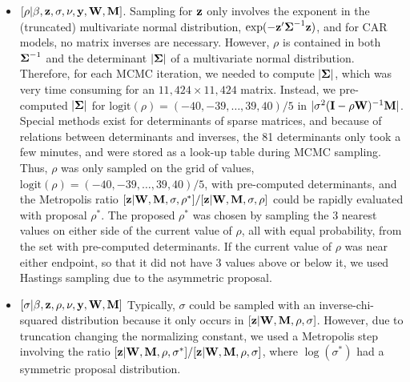\documentclass[11pt, titlepage]{article}
\begin{document}
\begin{spacing}{1.9}
\begin{flushleft}
\begin{itemize}
  \item $[\rho|\beta,\mathbf{z},\sigma,\nu,\mathbf{y},\mathbf{W},\mathbf{M}]$. Sampling for $\mathbf{z}$ only involves the exponent in the (truncated) multivariate normal distribution, $\exp(-\mathbf{z}^{\prime}\mbox{\boldmath $\Sigma$}^{-1}\mathbf{z})$, and for CAR models, no matrix inverses are necessary.  However, $\rho$ is contained in both $\mbox{\boldmath $\Sigma$}^{-1}$ and the determinant $|\mbox{\boldmath $\Sigma$}|$ of a multivariate normal distribution.  Therefore, for each MCMC iteration, we needed to compute $|\mbox{\boldmath $\Sigma$}|$, which was very time consuming for an $11,424 \times 11,424$ matrix.  Instead, we pre-computed $|\mbox{\boldmath $\Sigma$}|$ for $\textrm{logit}(\rho) = (-40, -39, \ldots, 39, 40)/5$ in $|\sigma^{2}(\mathbf{I} - \rho\mathbf{W})^{-1}\mathbf{M}|$.  Special methods exist for determinants of sparse matrices, and because of relations between determinants and inverses, the 81 determinants only took a few minutes, and were stored as a look-up table during MCMC sampling.  Thus, $\rho$ was only sampled on the grid of values, $\textrm{logit}(\rho) = (-40, -39, \ldots, 39, 40)/5$, with pre-computed determinants, and the Metropolis ratio $[\mathbf{z}|\mathbf{W},\mathbf{M},\sigma,\rho^{*}]/[\mathbf{z}|\mathbf{W},\mathbf{M},\sigma,\rho]$ could be rapidly evaluated with proposal $\rho^{*}$.  The proposed $\rho^{*}$ was chosen by sampling the 3 nearest values on either side of the current value of $\rho$, all with equal probability, from the set with pre-computed determinants.  If the current value of $\rho$ was near either endpoint, so that it did not have 3 values above or below it, we used Hastings sampling due to the asymmetric proposal.
  \item $[\sigma|\beta,\mathbf{z},\rho,\nu,\mathbf{y},\mathbf{W},\mathbf{M}]$  Typically, $\sigma$ could be sampled with an inverse-chi-squared distribution \citep{gelman_bayesian_2013} because it only occurs in $[\mathbf{z}|\mathbf{W},\mathbf{M},\rho,\sigma]$. However, due to truncation changing the normalizing constant, we used a Metropolis step involving the ratio $[\mathbf{z}|\mathbf{W},\mathbf{M},\rho,\sigma^{*}]/[\mathbf{z}|\mathbf{W},\mathbf{M},\rho,\sigma]$, where $\log(\sigma^{*})$ had a symmetric proposal distribution.   

\end{itemize} 


\end{flushleft}
\end{spacing}
\end{document}
